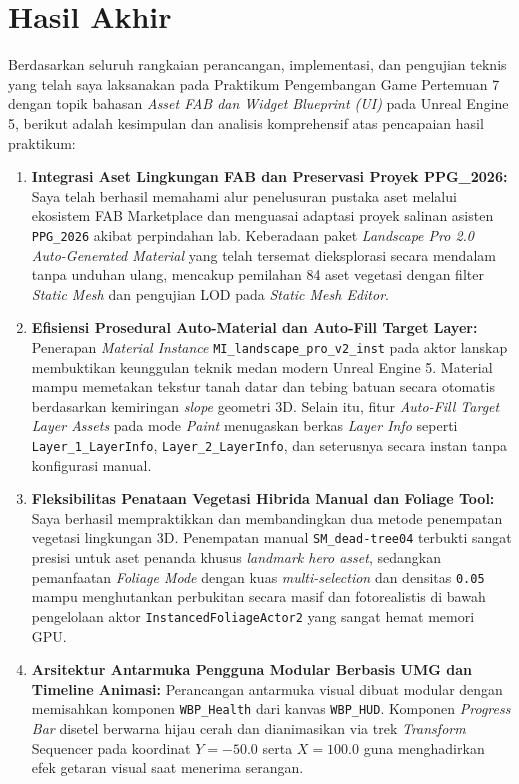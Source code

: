 \documentclass[a4paper,oneside,11pt]{book}
\begin{document}
\section{Hasil Akhir}

\par Berdasarkan seluruh rangkaian perancangan, implementasi, dan pengujian teknis yang telah saya laksanakan pada Praktikum Pengembangan Game Pertemuan 7 dengan topik bahasan \textit{Asset FAB dan Widget Blueprint (UI)} pada Unreal Engine 5, berikut adalah kesimpulan dan analisis komprehensif atas pencapaian hasil praktikum:
\begin{enumerate}[label=\alph*.]
  \item \textbf{Integrasi Aset Lingkungan FAB dan Preservasi Proyek PPG\_2026:} Saya telah berhasil memahami alur penelusuran pustaka aset melalui ekosistem FAB Marketplace dan menguasai adaptasi proyek salinan asisten \texttt{PPG\_2026} akibat perpindahan lab. Keberadaan paket \textit{Landscape Pro 2.0 Auto-Generated Material} yang telah tersemat dieksplorasi secara mendalam tanpa unduhan ulang, mencakup pemilahan 84 aset vegetasi dengan filter \textit{Static Mesh} dan pengujian LOD pada \textit{Static Mesh Editor}.
  \item \textbf{Efisiensi Prosedural Auto-Material dan Auto-Fill Target Layer:} Penerapan \textit{Material Instance} \texttt{MI\_landscape\_pro\_v2\_inst} pada aktor lanskap membuktikan keunggulan teknik medan modern Unreal Engine 5. Material mampu memetakan tekstur tanah datar dan tebing batuan secara otomatis berdasarkan kemiringan \textit{slope} geometri 3D. Selain itu, fitur \textit{Auto-Fill Target Layer Assets} pada mode \textit{Paint} menugaskan berkas \textit{Layer Info} seperti \texttt{Layer\_1\_LayerInfo}, \texttt{Layer\_2\_LayerInfo}, dan seterusnya secara instan tanpa konfigurasi manual.
  \item \textbf{Fleksibilitas Penataan Vegetasi Hibrida Manual dan Foliage Tool:} Saya berhasil mempraktikkan dan membandingkan dua metode penempatan vegetasi lingkungan 3D. Penempatan manual \texttt{SM\_dead-tree04} terbukti sangat presisi untuk aset penanda khusus \textit{landmark hero asset}, sedangkan pemanfaatan \textit{Foliage Mode} dengan kuas \textit{multi-selection} dan densitas \texttt{0.05} mampu menghutankan perbukitan secara masif dan fotorealistis di bawah pengelolaan aktor \texttt{InstancedFoliageActor2} yang sangat hemat memori GPU.
  \item \textbf{Arsitektur Antarmuka Pengguna Modular Berbasis UMG dan Timeline Animasi:} Perancangan antarmuka visual dibuat modular dengan memisahkan komponen \texttt{WBP\_Health} dari kanvas \texttt{WBP\_HUD}. Komponen \textit{Progress Bar} disetel berwarna hijau cerah dan dianimasikan via trek \textit{Transform} Sequencer pada koordinat $Y = -50.0$ serta $X = 100.0$ guna menghadirkan efek getaran visual saat menerima serangan.

\end{enumerate}
\end{document}
